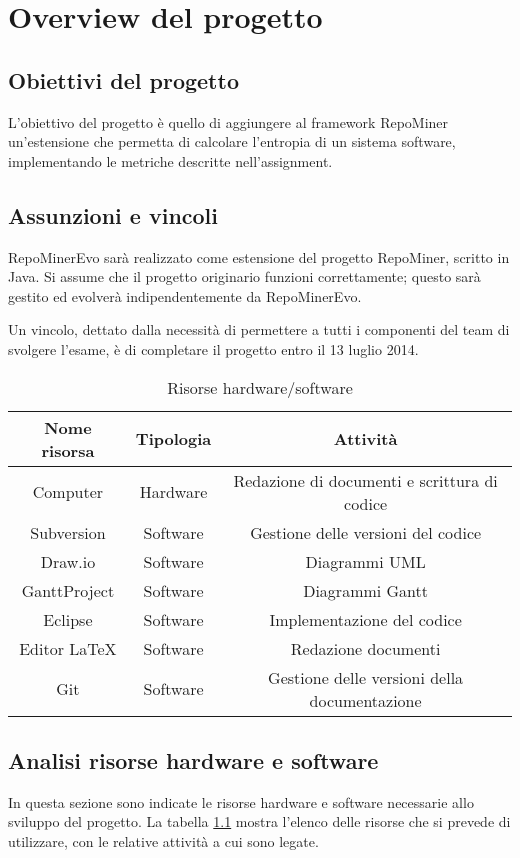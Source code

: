 \chapter{Overview del progetto}
\section{Obiettivi del progetto}
L'obiettivo del progetto è quello di aggiungere al framework RepoMiner un'estensione che permetta di calcolare l'entropia di un sistema software, implementando le metriche descritte nell'assignment.

\section{Assunzioni e vincoli}
RepoMinerEvo sarà realizzato come estensione del progetto RepoMiner, scritto in Java. Si assume che il progetto originario funzioni correttamente; questo sarà gestito ed evolverà indipendentemente da RepoMinerEvo.

Un vincolo, dettato dalla necessità di permettere a tutti i componenti del team di svolgere l'esame, è di completare il progetto entro il 13 luglio 2014. 
\begin{table}[b]
	\begin{tabular}{|c|c|c|}
	\hline
	\textbf{Nome risorsa} & \textbf{Tipologia} & \textbf{Attività}\\
	\hline
	Computer		& Hardware	& Redazione di documenti e scrittura di codice\\
	\hline
	Subversion		& Software	& Gestione delle versioni del codice\\
	\hline
	Draw.io			& Software	& Diagrammi UML\\
	\hline
	GanttProject	& Software	& Diagrammi Gantt\\
	\hline
	Eclipse			& Software	& Implementazione del codice\\
	\hline
	Editor \LaTeX 	& Software	& Redazione documenti\\
	\hline
	Git		 		& Software 	& Gestione delle versioni della documentazione\\
	\hline
	\end{tabular}
	\caption{Risorse hardware/software}
	\label{overview:risorsehwsw}
\end{table}
\section{Analisi risorse hardware e software}
In questa sezione sono indicate le risorse hardware e software necessarie allo sviluppo del progetto. La tabella \ref{overview:risorsehwsw} mostra l'elenco delle risorse che si prevede di utilizzare, con le relative attività a cui sono legate.

